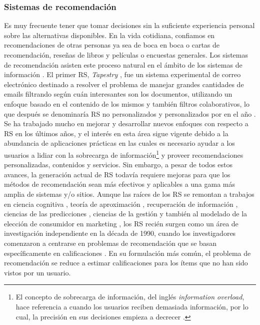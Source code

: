 \subsubsection{Sistemas de recomendación}
\noindent Es muy frecuente tener que tomar decisiones sin la suficiente experiencia personal sobre las alternativas disponibles. En la vida cotidiana, confiamos en recomendaciones de otras personas ya sea de boca en boca o cartas de recomendación, reseñas de libros y películas o encuestas generales. Los sistemas de recomendación asisten este proceso natural en el ámbito de los sistemas de información \citep{resnick1997recommender}. El primer RS, \textit{Tapestry} \citep{goldberg1992using}, fue un sistema experimental de correo electrónico destinado a resolver el problema de manejar grandes cantidades de emails filtrando según cuán interesantes son los documentos, utilizando un enfoque basado en el contenido de los mismos y también filtros colaborativos, lo que después se denominaría RS no personalizados y personalizados por \citeauthor{ricci2011introduction} en el año \citeyear{ricci2011introduction}. Se ha trabajado mucho en mejorar y desarrollar nuevos enfoques con respecto a RS en los últimos años, y el interés en esta área sigue vigente debido a la abundancia de aplicaciones prácticas en las cuales es necesario ayudar a los usuarios a lidiar con la sobrecarga de información\footnote{El concepto de sobrecarga de información, del inglés \textit{information overload}, hace referencia a cuando los usuarios reciben demasiada información, por lo cual, la precisión en sus decisiones empieza a decrecer \citep{eppler2004concept}.} y proveer recomendaciones personalizadas, contenidos y servicios. Sin embargo, a pesar de todos estos avances, la generación actual de RS todavía requiere mejoras para que los métodos de recomendación sean más efectivos y aplicables a una gama más amplia de sistemas y/o sitios. Aunque las raíces de los RS se remontan a trabajos en ciencia cognitiva \citep{rich1979user}, teoría de aproximación \citep{powell1981approximation}, recuperación de información \citep{salton1989automatic}, ciencias de las predicciones \citep{armstrong2001principles}, ciencias de la gestión \citep{murthi2003role} y también al modelado de la elección de consumidor en marketing \citep{lilien1992marketing}, los RS recién surgen como un área de investigación independiente en la década de 1990, cuando los investigadores comenzaron a centrarse en problemas de recomendación que se basan específicamente en calificaciones \citep{adomavicius2005toward}. En su formulación más común, el problema de recomendación se reduce a estimar calificaciones para los ítems que no han sido vistos por un usuario.

